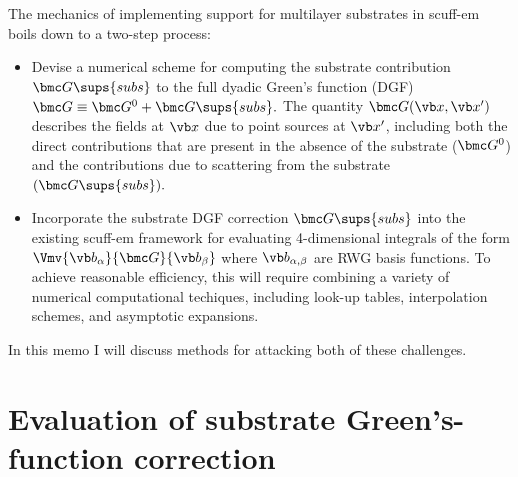 \documentclass[letterpaper]{article}
\begin{document}
The mechanics of implementing support for multilayer substrates
in {\sc scuff-em} boils down to a two-step process:
\begin{itemize}
 \item Devise a numerical scheme for computing the
       substrate contribution $\bmc G\sups{subs}$
       to the full dyadic Green's function (DGF)
       $\bmc G\equiv \bmc G^0 + \bmc G\sups{subs}.$
       The quantity $\bmc G(\vb x, \vb x^\prime)$
       describes the fields at $\vb x$ due to
       point sources at $\vb x^\prime$, including
       both the direct contributions that are present
       in the absence of the substrate ($\bmc G^0$)
       and the contributions due to scattering from the
       substrate $(\bmc G\sups{subs}).$
 \item Incorporate the substrate DGF correction $\bmc G\sups{subs}$ into
       the existing {\sc scuff-em} framework for
       evaluating 4-dimensional integrals of the form
       $\Vmv{\vb b_\alpha}{\bmc G}{\vb b_\beta}$
       where $\vb b_{\alpha,\beta}$ are RWG basis functions.
       To achieve reasonable efficiency, this will require
       combining a variety of numerical computational 
       techiques, including look-up tables, interpolation schemes,
       and asymptotic expansions.
\end{itemize}

In this memo I will discuss methods for attacking
both of these challenges.

\newpage
\section{Evaluation of substrate Green's-function correction}
\end{document}
